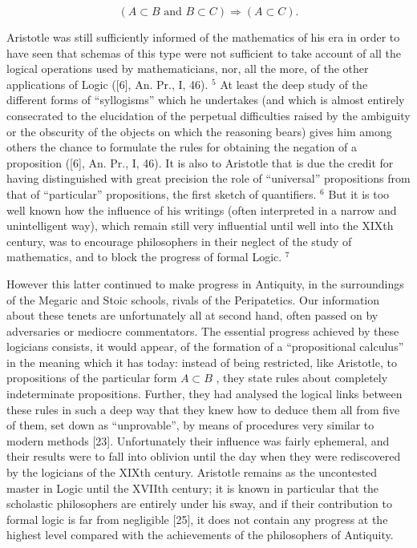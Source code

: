 \[
(A \subset B \text {   and   } B \subset C) \Rightarrow (A \subset C).
\]

Aristotle was still sufficiently informed of the mathematics of his era in order to have seen that schemas of this type were not sufficient to take account of all the logical operations used by mathematicians, nor, all the more, of the other applications of Logic ({[}6{]}, An. Pr., I, 46). \(^{5}\) At least the deep study of the different forms of ``syllogisms'' which he undertakes (and which is almost entirely consecrated to the elucidation of the perpetual difficulties raised by the ambiguity or the obscurity of the objects on which the reasoning bears) gives him among others the chance to formulate the rules for obtaining the negation of a proposition ({[}6{]}, An. Pr., I, 46). It is also to Aristotle that is due the credit for having distinguished with great precision the role of ``universal'' propositions from that of ``particular'' propositions, the first sketch of quantifiers. \(^{6}\) But it is too well known how the influence of his writings (often interpreted in a narrow and unintelligent way), which remain still very influential until well into the XIXth century, was to encourage philosophers in their neglect of the study of mathematics, and to block the progress of formal Logic. \(^{7}\)

However this latter continued to make progress in Antiquity, in the surroundings of the Megaric and Stoic schools, rivals of the Peripatetics. Our information about these tenets are unfortunately all at second hand, often passed on by adversaries or mediocre commentators. The essential progress achieved by these logicians consists, it would appear, of the formation of a ``propositional calculus'' in the meaning which it has today: instead of being restricted, like Aristotle, to propositions of the particular form \(A \subset B\) , they state rules about completely indeterminate propositions. Further, they had analysed the logical links between these rules in such a deep way that they knew how to deduce them all from five of them, set down as ``unprovable'', by means of procedures very similar to modern methods {[}23{]}. Unfortunately their influence was fairly ephemeral, and their results were to fall into oblivion until the day when they were rediscovered by the logicians of the XIXth century. Aristotle remains as the uncontested master in Logic until the XVIIth century; it is known in particular that the scholastic philosophers are entirely under his sway, and if their contribution to formal logic is far from negligible {[}25{]}, it does not contain any progress at the highest level compared with the achievements of the philosophers of Antiquity.

